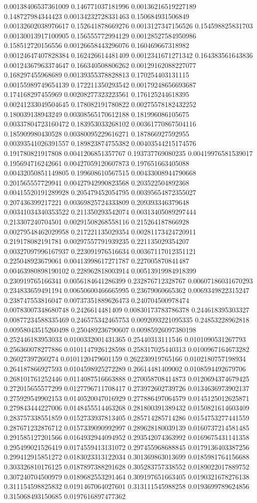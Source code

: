 \begin{table}
\begin{tabu}
\begin{sparkline}{10}
0.00138406537361009 0.146771037181996 0.00136216519227189 0.148727984344423 0.00134232728331463 0.150684931506849 0.00132602038976617 0.152641878669276 0.0013127347156526 0.154598825831703 0.00130013917100905 0.156555772994129 0.00128527584950986 0.158512720156556 0.00126658443296076 0.160469667318982 0.00124647407828384 0.162426614481409 0.0012341671271342 0.164383561643836 0.00124367963374647 0.166340508806262 0.00129162088227077 0.168297455968689 0.00139355378828813 0.170254403131115 0.00155989749654139 0.172211350293542 0.00179248656693687 0.174168297455969 0.00208277323223561 0.176125244618395 0.00241233049504645 0.178082191780822 0.00275578182432252 0.180039138943249 0.00308565170612188 0.181996086105675 0.00337804723160472 0.183953033268102 0.00361770867504116 0.185909980430528 0.00380095229616271 0.187866927592955 0.00393541026391557 0.189823874755382 0.00403544215174576 0.191780821917808 0.0041206851357767 0.193737769080235 0.00419976581539017 0.195694716242661 0.00427059120607873 0.197651663405088 0.00432050851149805 0.199608610567515 0.00433008944790668 0.201565557729941 0.00427942990823568 0.203522504892368 0.00415520191289928 0.205479452054795 0.00395654872355027 0.207436399217221 0.00369825724333809 0.209393346379648 0.00341034340353522 0.211350293542074 0.00313405089297444 0.213307240704501 0.00291508268558116 0.215264187866928 0.00279548462029958 0.217221135029354 0.00281173424720911 0.219178082191781 0.00297557791939235 0.221135029354207 0.00327097996167937 0.223091976516634 0.00367117012351121 0.225048923679061 0.00413998617271787 0.227005870841487 0.00463980898190102 0.228962818003914 0.00513919984918399 0.230919765166341 0.0056184641286399 0.232876712328767 0.00607186031670293 0.234833659491194 0.00650600466665995 0.23679060665362 0.0069349822315247 0.238747553816047 0.00737351889626473 0.240704500978474 0.00783007348680748 0.2426614481409 0.00830173783786378 0.244618395303327 0.00877234588335469 0.246575342465753 0.0092093221095335 0.24853228962818 0.00958043515260498 0.250489236790607 0.00985926097380198 0.252446183953033 0.0100332001431365 0.25440313111546 0.0101090531267793 0.256360078277886 0.0101147926128598 0.258317025440313 0.0100967164673282 0.26027397260274 0.0101120479601159 0.262230919765166 0.0102180757198934 0.264187866927593 0.0104598925272289 0.26614481409002 0.0108594492679706 0.268101761252446 0.0114087516663888 0.270058708414873 0.0120694374679425 0.272015655577299 0.0127796711708417 0.273972602739726 0.0134636973902137 0.275929549902153 0.0140520047016929 0.277886497064579 0.0145125012625871 0.279843444227006 0.0148455514463268 0.281800391389432 0.0150821614603409 0.283757338551859 0.0152733937813405 0.285714285714286 0.0154753277441559 0.287671232876712 0.0157339090992997 0.289628180039139 0.0160737214581485 0.291585127201566 0.0164932944094952 0.293542074363992 0.0169675431141358 0.295499021526419 0.0174559413131072 0.297455968688845 0.0179136403387256 0.299412915851272 0.0183023313122034 0.301369863013699 0.0185981764156688 0.303326810176125 0.0187897388291628 0.305283757338552 0.0189022017889752 0.307240704500979 0.0189682553291464 0.309197651663405 0.0190321678276138 0.311154598825832 0.0191467064027601 0.313111545988258 0.0193699789624856 0.315068493150685 0.0197616897477362 
\end{sparkline}
\end{tabu}
\end{table}
